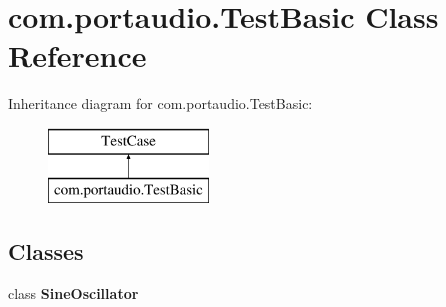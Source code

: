 \hypertarget{classcom_1_1portaudio_1_1_test_basic}{}\section{com.\+portaudio.\+Test\+Basic Class Reference}
\label{classcom_1_1portaudio_1_1_test_basic}
Inheritance diagram for com.\+portaudio.\+Test\+Basic\+:\begin{figure}[H]
\begin{center}
\leavevmode
\includegraphics[height=2.000000cm]{classcom_1_1portaudio_1_1_test_basic}
\end{center}
\end{figure}
\subsection*{Classes}
\begin{DoxyCompactItemize}
\item 
class {\bfseries Sine\+Oscillator}
\end{DoxyCompactItemize}
